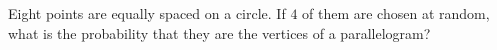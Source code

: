 Eight points are equally spaced on a circle. If $4$ of them are chosen at random, what is the probability that they are the vertices of a parallelogram?
